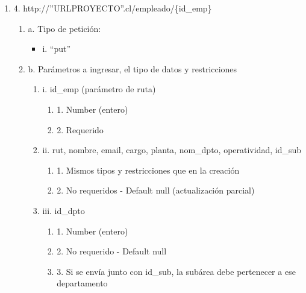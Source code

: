 \begin{enumerate}
    \item 4. http://”URLPROYECTO”.cl/empleado/\{id\_emp\}
    \begin{enumerate}
        \item a. Tipo de petición:
            \begin{itemize}
               \item i. “put”
            \end{itemize}
        \item b. Parámetros a ingresar, el tipo de datos y restricciones
            \begin{enumerate}
                \item i. id\_emp (parámetro de ruta)
                    \begin{enumerate}
                        \item 1. Number (entero)
                        \item 2. Requerido
                    \end{enumerate}
                \item ii. rut, nombre, email, cargo, planta, nom\_dpto, operatividad, id\_sub
                    \begin{enumerate}
                        \item 1. Mismos tipos y restricciones que en la creación
                        \item 2. No requeridos - Default null (actualización parcial)
                    \end{enumerate}
                \item iii. id\_dpto
                    \begin{enumerate}
                        \item 1. Number (entero)
                        \item 2. No requerido - Default null
                        \item 3. Si se envía junto con id\_sub, la subárea debe pertenecer a ese departamento
                    \end{enumerate}
            \end{enumerate}
    \end{enumerate}


\end{enumerate}
